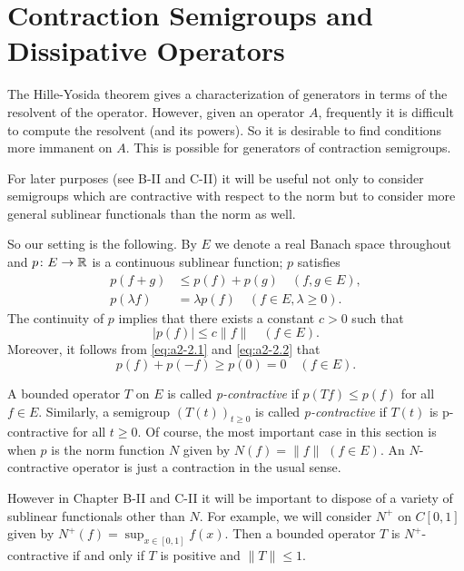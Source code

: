 \section{Contraction Semigroups and Dissipative Operators}\label{sec:a2-2}%
\hspace{1cm}{\Large by Wolfgang Arendt}
\vspace{.5cm}
\newline
The Hille-Yosida theorem gives a characterization of generators in terms of the resolvent of the operator.
However, given an operator $A$, frequently it is difficult to compute the resolvent (and its powers).
So it is desirable to find conditions more immanent on $A$.
This is possible for generators of contraction semigroups.

For later purposes (see B-II and C-II) it will be useful not only to consider semigroups which are contractive with respect to the norm but to consider more general sublinear functionals than the norm as well.

So our setting is the following.
By $E$ we denote a real Banach space throughout and $p \colon E \to \mathbb{R}$ is a continuous sublinear function; \ie $p$ satisfies
\begin{align}
p(f+g) &\leq p(f) + p(g) \quad (f, g \in E), \label{eq:a2-2.1} \\
p(\lambda f) &= \lambda p(f) \quad (f \in E, \lambda \geq 0).\label{eq:a2-2.2}
\end{align}
The continuity of $p$ implies that there exists a constant $c > 0$ such that
\begin{equation}\label{eq:a2-2.3}
	|p(f)| \leq c\|f\| \quad (f \in E).
\end{equation}
Moreover, it follows from \eqref{eq:a2-2.1} and \eqref{eq:a2-2.2} that
\begin{equation}\label{eq:a2-2.4}
	p(f) + p(-f) \geq p(0) = 0 \quad (f \in E).
\end{equation}

A bounded operator $T$ on $E$ is called \emph{p-contractive} if $p(Tf) \leq p(f)$ for all $f \in E$.
Similarly, a semigroup $(T(t))_{t\geq 0}$ is called \emph{p-contractive} if $T(t)$ is p-contractive for all $t \geq 0$.
Of course, the most important case in this section is when $p$ is the norm function $N$ given by $N(f) = \|f\|$ $(f \in E)$.
An $N$-contractive operator is just a contraction in the usual sense.
\begin{remark*} \label{rem:a2-2.1-kgk}
However in Chapter B-II and C-II it will be important to dispose of a variety of sublinear functionals other than $N$.
For example, we will consider $N^{+}$ on $C[0,1]$ given by $N^{+}(f) = \sup_{x \in [0,1]} f(x)$.
Then a bounded operator $T$ is $N^{+}$-contractive if and only if $T$ is positive and $\|T\| \leq 1$.
\end{remark*}

